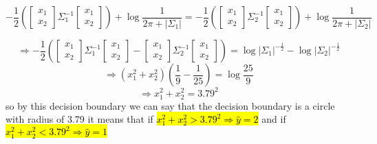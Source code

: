 \begin{qsolve}
\begin{qsolve}[]
		$$
		- \frac{1}{2} (\begin{bmatrix}
			x_1 \\ x_2
		\end{bmatrix} \Sigma_1^{-1} \begin{bmatrix}
			x_1 \\ x_2
			\end{bmatrix}) +\log\frac{1}{2\pi + |\Sigma_1|} = - \frac{1}{2} (\begin{bmatrix}
				x_1 \\ x_2
			\end{bmatrix} \Sigma_2^{-1} \begin{bmatrix}
				x_1 \\ x_2
				\end{bmatrix}) +\log\frac{1}{2\pi + |\Sigma_2|}
		$$

		$$
		\Rightarrow - \frac{1}{2} (\begin{bmatrix}
			x_1 \\ x_2
			\end{bmatrix} \Sigma_1^{-1} \begin{bmatrix}
				x_1 \\ x_2
				\end{bmatrix} - \begin{bmatrix}
					x_1 \\ x_2
				\end{bmatrix} \Sigma_2^{-1} \begin{bmatrix}
					x_1 \\ x_2
					\end{bmatrix}) = \log|\Sigma_1|^{-\frac{1}{2}} - \log|\Sigma_2|^{-\frac{1}{2}} 					
		$$
		$$
		\Rightarrow (x_1^2 + x_2^2) \left(\frac{1}{9} - \frac{1}{25}\right) = \log\frac{25}{9}
		$$
		$$
		\Rightarrow x_1^2 + x_2^2 = 3.79^2
		$$
		so by this decision boundary we can say that the decision boundary is a circle with radius of 3.79 it means that if \hl{$x_1^2 + x_2^2 > 3.79^2 \Rightarrow \hat{y} = 2$} and if \hl{$x_1^2 + x_2^2 < 3.79^2 \Rightarrow \hat{y} = 1$}
	\end{qsolve}
\end{qsolve}